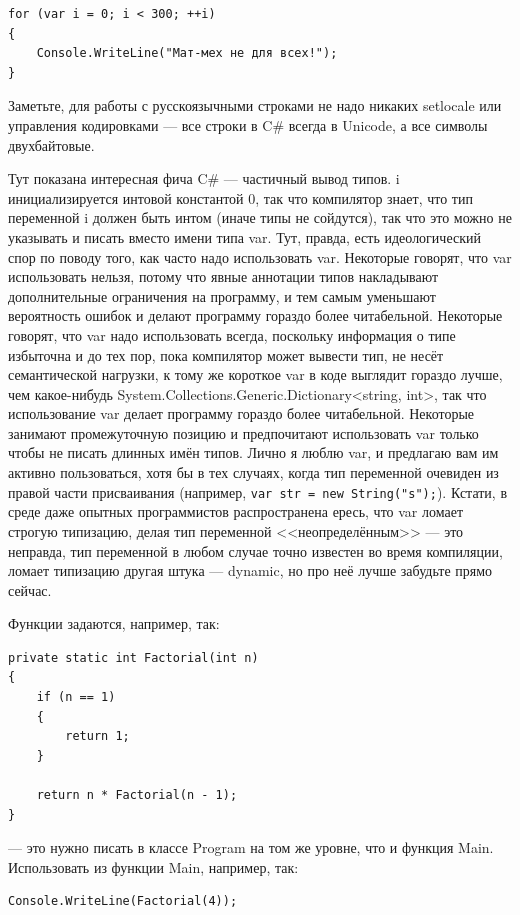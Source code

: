 \documentclass[a5paper]{article}
\begin{document}
\begin{verbatim}
for (var i = 0; i < 300; ++i)
{
    Console.WriteLine("Мат-мех не для всех!");
}
\end{verbatim}

Заметьте, для работы с русскоязычными строками не надо никаких setlocale или управления кодировками --- все строки в C\# всегда в Unicode, а все символы двухбайтовые.

Тут показана интересная фича C\# --- частичный вывод типов. i инициализируется интовой константой 0, так что компилятор знает, что тип переменной i должен быть интом (иначе типы не сойдутся), так что это можно не указывать и писать вместо имени типа var. Тут, правда, есть идеологический спор по поводу того, как часто надо использовать var. Некоторые говорят, что var использовать нельзя, потому что явные аннотации типов накладывают дополнительные ограничения на программу, и тем самым уменьшают вероятность ошибок и делают программу гораздо более читабельной. Некоторые говорят, что var надо использовать всегда, поскольку информация о типе избыточна и до тех пор, пока компилятор может вывести тип, не несёт семантической нагрузки, к тому же короткое var в коде выглядит гораздо лучше, чем какое-нибудь System.Collections.Generic.Dictionary<string, int>, так что использование var делает программу гораздо более читабельной. Некоторые занимают промежуточную позицию и предпочитают использовать var только чтобы не писать длинных имён типов. Лично я люблю var, и предлагаю вам им активно пользоваться, хотя бы в тех случаях, когда тип переменной очевиден из правой части присваивания (например, \texttt{var str = new String("s");}). Кстати, в среде даже опытных программистов распространена ересь, что var ломает строгую типизацию, делая тип переменной <<неопределённым>> --- это неправда, тип переменной в любом случае точно известен во время компиляции, ломает типизацию другая штука --- dynamic, но про неё лучше забудьте прямо сейчас.

Функции задаются, например, так:

\begin{verbatim}
private static int Factorial(int n)
{
    if (n == 1)
    {
        return 1;
    }

    return n * Factorial(n - 1);
}
\end{verbatim}

--- это нужно писать в классе Program на том же уровне, что и функция Main. Использовать из функции Main, например, так:

\begin{verbatim}
Console.WriteLine(Factorial(4));
\end{verbatim}
\end{document}

